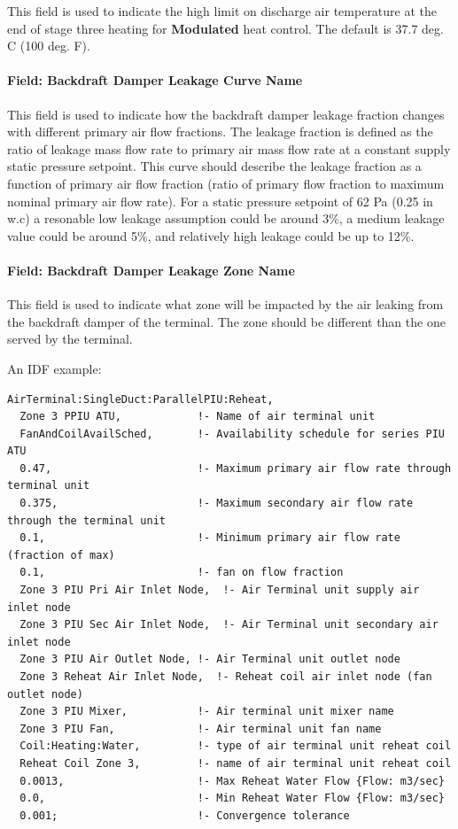 This field is used to indicate the high limit on discharge air temperature at the end of stage three heating for \textbf{Modulated} heat control.  The default is 37.7 deg. C (100 deg. F).

\paragraph{Field: Backdraft Damper Leakage Curve Name}\label{field-backdraft_damper_leakage_fraction_curve_name}

This field is used to indicate how the backdraft damper leakage fraction changes with different primary air flow fractions. The leakage fraction is defined as the ratio of leakage mass flow rate to primary air mass flow rate at a constant supply static pressure setpoint. This curve should describe the leakage fraction as a function of primary air flow fraction (ratio of primary flow fraction to maximum nominal primary air flow rate). For a static pressure setpoint of 62 Pa (0.25 in w.c) a resonable low leakage assumption could be around 3\%, a medium leakage value could be around 5\%, and relatively high leakage could be up to 12\%.

\paragraph{Field: Backdraft Damper Leakage Zone Name}\label{field-backdraft_damper_leakage_zone_name}

This field is used to indicate what zone will be impacted by the air leaking from the backdraft damper of the terminal. The zone should be different than the one served by the terminal.

An IDF example:

\begin{lstlisting}
AirTerminal:SingleDuct:ParallelPIU:Reheat,
  Zone 3 PPIU ATU,            !- Name of air terminal unit
  FanAndCoilAvailSched,       !- Availability schedule for series PIU ATU
  0.47,                       !- Maximum primary air flow rate through terminal unit
  0.375,                      !- Maximum secondary air flow rate through the terminal unit
  0.1,                        !- Minimum primary air flow rate (fraction of max)
  0.1,                        !- fan on flow fraction
  Zone 3 PIU Pri Air Inlet Node,  !- Air Terminal unit supply air inlet node
  Zone 3 PIU Sec Air Inlet Node,  !- Air Terminal unit secondary air inlet node
  Zone 3 PIU Air Outlet Node, !- Air Terminal unit outlet node
  Zone 3 Reheat Air Inlet Node,  !- Reheat coil air inlet node (fan outlet node)
  Zone 3 PIU Mixer,           !- Air terminal unit mixer name
  Zone 3 PIU Fan,             !- Air terminal unit fan name
  Coil:Heating:Water,         !- type of air terminal unit reheat coil
  Reheat Coil Zone 3,         !- name of air terminal unit reheat coil
  0.0013,                     !- Max Reheat Water Flow {Flow: m3/sec}
  0.0,                        !- Min Reheat Water Flow {Flow: m3/sec}
  0.001;                      !- Convergence tolerance
\end{lstlisting}

